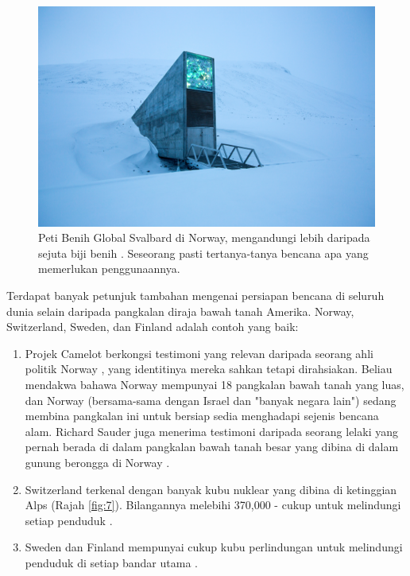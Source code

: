 \documentclass[10pt,twocolumn,letterpaper]{article}
\begin{document}
\begin{figure}[t]
\begin{center}
   \includegraphics[width=1\linewidth]{svalbard.jpg}
\end{center}
   \caption{Peti Benih Global Svalbard di Norway, mengandungi lebih daripada sejuta biji benih \cite{24}. Seseorang pasti tertanya-tanya bencana apa yang memerlukan penggunaannya.}
\label{fig:8}
\label{fig:onecol}
\end{figure}

Terdapat banyak petunjuk tambahan mengenai persiapan bencana di seluruh dunia selain daripada pangkalan diraja bawah tanah Amerika. Norway, Switzerland, Sweden, dan Finland adalah contoh yang baik:

\begin{flushleft}
\begin{enumerate}
    \item Projek Camelot berkongsi testimoni yang relevan daripada seorang ahli politik Norway \cite{25,26}, yang identitinya mereka sahkan tetapi dirahsiakan. Beliau mendakwa bahawa Norway mempunyai 18 pangkalan bawah tanah yang luas, dan Norway (bersama-sama dengan Israel dan "banyak negara lain") sedang membina pangkalan ini untuk bersiap sedia menghadapi sejenis bencana alam. Richard Sauder juga menerima testimoni daripada seorang lelaki yang pernah berada di dalam pangkalan bawah tanah besar yang dibina di dalam gunung berongga di Norway \cite{22}.
    \item Switzerland terkenal dengan banyak kubu nuklear yang dibina di ketinggian Alps (Rajah \ref{fig:7}). Bilangannya melebihi 370,000 - cukup untuk melindungi setiap penduduk \cite{27}.
    \item Sweden dan Finland mempunyai cukup kubu perlindungan untuk melindungi penduduk di setiap bandar utama \cite{27}. 
\end{enumerate}
\end{flushleft}
\end{document}
